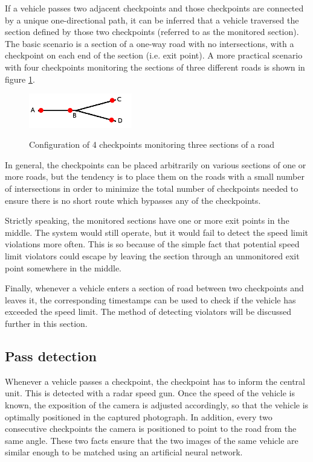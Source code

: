 \documentclass[times, utf8, zavrsni]{fer}
\begin{document}
If a vehicle passes two adjacent checkpoints and those checkpoints are connected
by a unique one-directional path, it can be inferred that a vehicle traversed
the section defined by those two checkpoints (referred to as the monitored
section). The basic scenario is a section of a one-way road with no
intersections, with a checkpoint on each end of the section (i.e. exit point). A
more practical scenario with four checkpoints monitoring the sections of three
different roads is shown in figure \ref{fig:checkpoints}.

\begin{figure}[htb]
\caption{Configuration of 4 checkpoints monitoring three sections of a road}
\centering
\includegraphics[width=0.4\textwidth]{images/checkpoints}
\label{fig:checkpoints}
\end{figure}

In general, the checkpoints can be placed arbitrarily on various sections of one
or more roads, but the tendency is to place them on the roads with a small
number of intersections in order to minimize the total number of checkpoints
needed to ensure there is no short route which bypasses any of the checkpoints.

Strictly speaking, the monitored sections have one or more exit points in the
middle. The system would still operate, but it would fail to detect the speed
limit violations more often. This is so because of the simple fact that
potential speed limit violators could escape by leaving the section through an
unmonitored exit point somewhere in the middle.
 
Finally, whenever a vehicle enters a section of road between two checkpoints and
leaves it, the corresponding timestamps can be used to check if the vehicle has
exceeded the speed limit. The method of detecting violators will be discussed
further in this section.

\subsection{Pass detection}
Whenever a vehicle passes a checkpoint, the checkpoint has to inform the central
unit. This is detected with a radar speed gun. Once the speed of the vehicle is
known, the exposition of the camera is adjusted accordingly, so that the vehicle
is optimally positioned in the captured photograph. In addition, every two
consecutive checkpoints the camera is positioned to point to the road from the
same angle. These two facts ensure that the two images of the same vehicle 
are similar enough to be matched using an artificial neural network.
\end{document}
